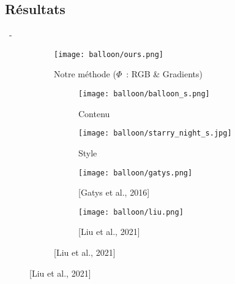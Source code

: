 \documentclass[aspectratio=169, 22pt]{beamer}
\begin{document}
\subsection{Résultats}
\begin{frame}{\secname~- \subsecname}
  \begin{figure}
    \begin{subfigure}{0.47\linewidth}
      \texttt{[image: balloon/ours.png]}
      \caption{Notre méthode ($\Phi$ : RGB \& Gradients)}
    \end{subfigure}
    \begin{subfigure}{0.45\linewidth}
      \begin{subfigure}{0.45\linewidth}
        \texttt{[image: balloon/balloon\_s.png]}
        \caption{Contenu}
      \end{subfigure}
      \begin{subfigure}{0.45\linewidth}
        \texttt{[image: balloon/starry\_night\_s.jpg]}
        \caption{Style}
      \end{subfigure}

      \begin{subfigure}{0.45\linewidth}
        \texttt{[image: balloon/gatys.png]}
        \caption{\scriptsize [Gatys et al., 2016]}
      \end{subfigure}
      \begin{subfigure}{0.45\linewidth}
        \texttt{[image: balloon/liu.png]}
        \caption{[Liu et al., 2021]}
      \end{subfigure}
    \end{subfigure}
  \end{figure}
\end{frame}
\end{document}
